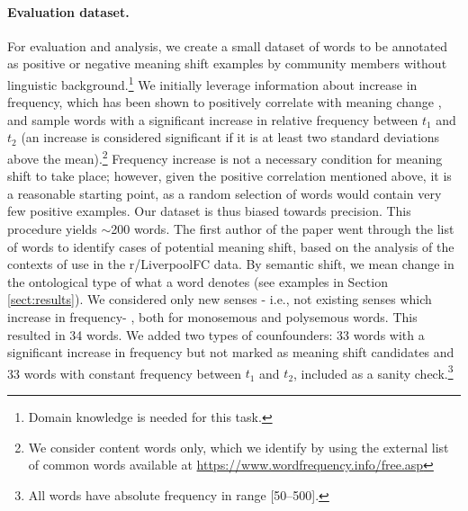 

\paragraph{Evaluation dataset.} 
For evaluation and analysis, we create a small dataset of words to be annotated as positive or negative meaning shift examples by community members without linguistic background.\footnote{Domain knowledge is needed for this task.}
We initially leverage information about increase in frequency, which has been shown to positively correlate with meaning change \cite{wijaya2011understanding,kulkarni2015statistically}, and sample words with a significant increase in relative frequency between $t_1$ and $t_2$ (an increase is considered significant if it is at least two standard deviations above the mean).\footnote{We consider   content words only, which we identify by using the external list of common words available at \url{https://www.wordfrequency.info/free.asp}} Frequency increase is not a necessary condition for meaning shift to take place; however, given the positive correlation mentioned above, it is a reasonable starting point, as a random selection of words would contain very few positive examples. Our dataset is thus biased towards precision. 
This procedure yields $\sim$200 words. The first author of the paper went through the list of words to identify cases of potential meaning shift, based on the analysis of the contexts of use in the r/LiverpoolFC data. By semantic shift, we mean change in the ontological type of what a word denotes (see examples in Section \ref{sect:results}). We considered only new senses - i.e., not existing senses which increase in frequency- , both for monosemous and polysemous words. This resulted in 34 words. We added two types of counfounders: 33 words with a significant increase in frequency but not marked as meaning shift candidates and 33 words with constant frequency between $t_1$ and $t_2$, included as a sanity check.\footnote{All words have absolute frequency in range [50--500].} 

